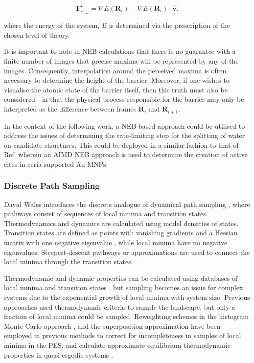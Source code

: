 \begin{equation}
    \textbf{F}_{i}^{t}|_{\perp} = \nabla E\left( \textbf{R}_{i} \right) - \nabla E\left( \textbf{R}_{i} \right) \cdot \hat{\textbf{v}}_{i}
    \label{neb:true}
\end{equation}

where the energy of the system, $E$ is determined via the prescription of the chosen level of theory.

It is important to note in NEB calculations that there is no guarantee with a finite number of images that precise maxima will be represented by any of the images. Consequently, interpolation around the perceived maxima is often necessary to determine the height of the barrier. Moreover, if one wishes to visualise the atomic state of the barrier itself, then this truth must also be considered - in that the physical process responsible for the barrier may only be interpreted as the difference between frames $\textbf{R}_{i}$ and $\textbf{R}_{i+1}$.

In the context of the following work, a NEB-based approach could be utilised to address the issues of determining the rate-limiting step for the splitting of water on candidate structures. This could be deployed in a similar fashion to that of Ref. \cite{Wang2015-qi} wherein an AIMD NEB approach is used to determine the creation of active cites in ceria-supported Au MNPs. 

\subsubsection{Discrete Path Sampling}
\label{sec:DPS }
David Wales introduces the discrete analogue of dynamical path sampling \cite{doi:10.1080/00268970210162691}, where pathways consist of sequences of local minima and transition states. Thermodynamics and dynamics are calculated using model densities of states. Transition states are defined as points with vanishing gradients and a Hessian matrix with one negative eigenvalue \cite{TF9686400371}, while local minima have no negative eigenvalues. Steepest-descent pathways or approximations are used to connect the local minima through the transition states.

Thermodynamic and dynamic properties can be calculated using databases of local minima and transition states \cite{10.1063/1.1484389}, but sampling becomes an issue for complex systems due to the exponential growth of local minima with system size. Previous approaches used thermodynamic criteria to sample the landscape, but only a fraction of local minima could be sampled. Reweighting schemes in the histogram Monte Carlo approach \cite{PhysRevLett.61.2635}, and the superposition approximation \cite{10.1063/1.1484389} have been employed in previous methods to correct for incompleteness in samples of local minima in the PES, and calculate approximate equilibrium thermodynamic properties in quasi-ergodic systems \cite{PhysRevLett.80.1357}.

